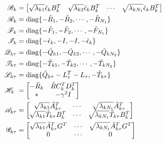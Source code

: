 	\begin{equation}\notag
	\begin{split}
	\mathscr{B}_{k}&= \begin{bmatrix}
	\sqrt{\lambda_{k1}}\tilde{\epsilon}_{k}B^{T}_{k}&\sqrt{\lambda_{k2}}\tilde{\epsilon}_{k}B^{T}_{k}&\cdots&\sqrt{\lambda_{kN_{1}}}\tilde{\epsilon}_{k}B^{T}_{k}
	\end{bmatrix}\\
	\mathscr{R}_{k}&= \mathrm{diag}\{-\tilde{R}_{1}, -\tilde{R}_{2}, \cdots, -\tilde{R}_{N_{1}} \} \\
	\mathscr{F}_{k}&= \mathrm{diag}\{-\tilde{F}_{1}, -\tilde{F}_{2}, \cdots, -\tilde{F}_{N_{1}} \} \\	
	\mathscr{I}_{k} &= \mathrm{diag}\{-\tilde{\epsilon}_{k}, -I, -I, -\tilde{\epsilon}_{k} \}\\	
	\mathscr{Q}_{k\tau }&= \mathrm{diag}\{-\tilde{Q}_{k1}, -\tilde{Q}_{k2}, \cdots, -\tilde{Q}_{kN_{2}} \}\\
	\mathscr{T}_{k\tau }&= \mathrm{diag}\{-\tilde{T}_{k1}, -\tilde{T}_{k2}, \cdots, -\tilde{T}_{kN_{2}} \}\\
	\mathscr{L}_{k\tau }&= \mathrm{diag}\{\tilde{Q}_{k\tau }-L^{T}_{\tau }-L_{\tau },  -\tilde{T}_{k\tau } \}\\
	\mathscr{H}_{k}\ &= \begin{bmatrix}
	-\tilde{R}_{k} & \tilde{R}C^{T}_{k}D^{T}_{k}\\
	*& -\gamma^{2}I
	\end{bmatrix} \\
	\mathscr{A}_{k\tau } &=\begin{bmatrix}
	\sqrt{\lambda_{k1}} \tilde{A}^{T}_{k\tau }& \cdots&\sqrt{\lambda_{kN_{1}}} \tilde{A}^{T}_{k\tau }\\
	\sqrt{\lambda_{k1}}\tilde{T}_{k\tau }B^{T}_{k} &\cdots&\sqrt{\lambda_{kN_{1}}} \tilde{T}_{k\tau }B^{T}_{k}\\
	\end{bmatrix} \\
	\mathscr{G}_{k\tau } &=\begin{bmatrix}
	\sqrt{\lambda_{k1}} \tilde{A}^{T}_{k\tau }G^{T}& \cdots&\sqrt{\lambda_{kN_{1}}} \tilde{A}^{T}_{k\tau }G^{T}\\
	0  &\cdots& 0
	\end{bmatrix}\\

\end{split}
\end{equation}
